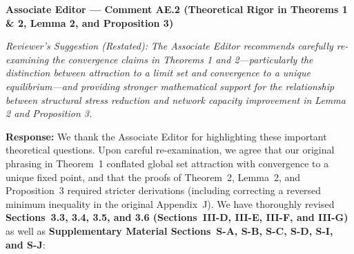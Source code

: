 \documentclass[11pt,a4paper]{article}
\newcommand{\cbox}[2]{%
  \vspace{0.6em}\noindent\textbf{#1}\par\smallskip
  \noindent\textit{Reviewer's Suggestion (Restated):} \textit{#2}\par\smallskip
}
\begin{document}
\hrulefill

\cbox{Associate Editor --- Comment AE.2 (Theoretical Rigor in Theorems 1 \& 2, Lemma 2, and Proposition 3)}{The Associate Editor recommends carefully re-examining the convergence claims in Theorems 1 and 2---particularly the distinction between attraction to a limit set and convergence to a unique equilibrium---and providing stronger mathematical support for the relationship between structural stress reduction and network capacity improvement in Lemma 2 and Proposition 3.}

\noindent\textbf{Response:} We thank the Associate Editor for highlighting these important theoretical questions. Upon careful re-examination, we agree that our original phrasing in Theorem~1 conflated global set attraction with convergence to a unique fixed point, and that the proofs of Theorem~2, Lemma~2, and Proposition~3 required stricter derivations (including correcting a reversed minimum inequality in the original Appendix~J). We have thoroughly revised \textbf{Sections~3.3, 3.4, 3.5, and 3.6 (Sections~III-D, III-E, III-F, and III-G)} as well as \textbf{Supplementary Material Sections~S-A, S-B, S-C, S-D, S-I, and S-J}:
\end{document}
